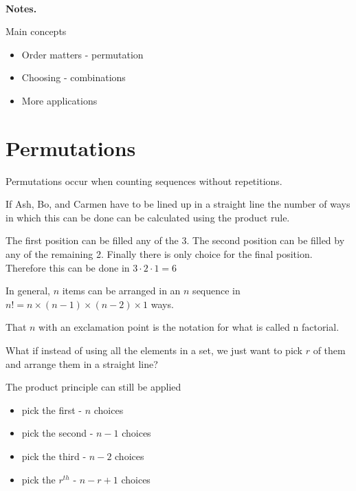 \documentclass[12pt]{article}
\begin{document}
\begin{center}
\\
\vspace{1cm}
\end{center}


\medskip\noindent

{\bf Notes.}

Main concepts

\begin{itemize}
\item Order matters - permutation
\item Choosing - combinations
\item More applications
\end{itemize}
\vspace{0.5cm}\noindent

\section*{Permutations}
Permutations occur when counting sequences without repetitions. 

If Ash, Bo, and Carmen  have to be lined up in a straight line the number of ways in which this can be done can be calculated using the product rule. 

The first position can be filled any of the 3. The second position can be filled by any of the remaining 2. Finally there is only choice for the final position. Therefore this can be done in $3 \cdot 2 \cdot 1 = 6$

In general, $n$ items can be arranged in an $n$ sequence in $n! = n \times (n-1) \times (n-2) \times 1$ ways.

That $n$ with an exclamation point is the notation for what is called n factorial.

What if instead of using all the elements in a set, we just want to pick $r$ of them and arrange them in a straight line?

The product principle can still be applied

\begin{itemize}
\item pick the first - $n$ choices
\item pick the second - $n-1$ choices
\item pick the third - $n-2$ choices
\item pick the $r^{th}$ - $n-r+1$ choices
\end{itemize}
\end{document}
